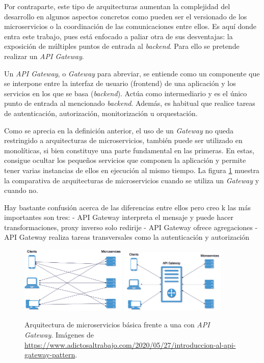 \documentclass[11pt,spanish,listoffigures]{tfgetsinf}
\begin{document}
Por contraparte, este tipo de arquitecturas aumentan la complejidad del desarrollo en algunos aspectos concretos como pueden ser el versionado de los microservicios o la coordinación de las comunicaciones entre ellos. Es aquí donde entra este trabajo, pues está enfocado a paliar otra de sus desventajas: la exposición de múltiples puntos de entrada al \emph{backend}. Para ello se pretende realizar un \emph{API Gateway}.

Un \emph{API Gateway}, o \emph{Gateway} para abreviar, se entiende como un componente que se interpone entre la interfaz de usuario (frontend) de una aplicación y los servicios en los que se basa (\emph{backend}). Actúa como intermediario y es el único punto de entrada al mencionado \emph{backend}. Además, es habitual que realice tareas de autenticación, autorización, monitorización u orquestación.

Como se aprecia en la definición anterior, el uso de un \emph{Gateway} no queda restringido a arquitecturas de microservicios, también puede ser utilizado en monolíticas, si bien constituye una parte fundamental en las primeras. En estas, consigue ocultar los pequeños servicios que componen la aplicación y permite tener varias instancias de ellos en ejecución al mismo tiempo. La figura \ref{figura:gateway_o_no} muestra la comparativa de arquitecturas de microservicios cuando se utiliza un \emph{Gateway} y cuando no.

Hay bastante confusión acerca de las diferencias entre ellos pero creo k las más importantes son tres:
- API Gateway interpreta el mensaje y puede hacer transformaciones, proxy inverso solo redirije
- API Gateway ofrece agregaciones
- API Gateway realiza tareas transversales como la autenticación y autorización

\begin{figure}[ht]
	\centering
	\label{figura:gateway_o_no}
	\includegraphics[width=0.45\textwidth]{images/arquitecturaMicroserviciosBasica}
	\includegraphics[width=0.45\textwidth]{images/arquitecturaMicroserviciosConGateway}
	\caption{Arquitectura de microservicios básica frente a una con \emph{API Gateway}. Imágenes de \url{https://www.adictosaltrabajo.com/2020/05/27/introduccion-al-api-gateway-pattern}.}
\end{figure}
\end{document}
